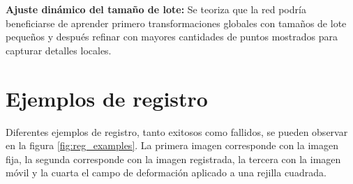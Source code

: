 \textbf{Ajuste dinámico del tamaño de lote:} Se teoriza que la red podría beneficiarse de aprender primero transformaciones globales con tamaños de lote pequeños y después refinar con mayores cantidades de puntos mostrados para capturar detalles locales.

\section{Ejemplos de registro}\label{sec:Ejemplos de registro}

Diferentes ejemplos de registro, tanto exitosos como fallidos, se pueden observar en la figura \ref{fig:reg_examples}.
La primera imagen corresponde con la imagen fija, la segunda corresponde con la imagen registrada, la tercera con la imagen móvil y la cuarta el campo de deformación aplicado a una rejilla cuadrada.

